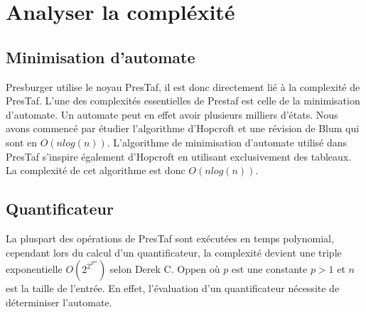 \section{Analyser la compléxité}



\subsection{Minimisation d'automate}

Presburger utilise le noyau PresTaf, il est donc directement lié à la complexité de PresTaf. L'une des complexités essentielles de Prestaf est celle de la minimisation d'automate. Un automate peut en effet avoir plusieurs milliers d'états. Nous avons commencé par étudier l'algorithme d'Hopcroft et une révision de Blum qui sont en $O(nlog(n))$. L'algorithme de minimisation d'automate utilisé dans PresTaf s'inspire également d'Hopcroft en utilisant exclusivement des tableaux. La complexité de cet algorithme est donc $O(nlog(n))$. 

\subsection{Quantificateur}

La pluspart des opérations de PresTaf sont exécutées en temps polynomial, cependant lors du calcul d'un quantificateur, la complexité devient une triple exponentielle $O(2^{2^{2^{pn}}})$ selon Derek C. Oppen\cite{oppen1978222pn} où $p$ est une constante $p > 1$ et $n$ est la taille de l'entrée. En effet, l'évaluation d'un quantificateur nécessite de déterminiser l'automate.


